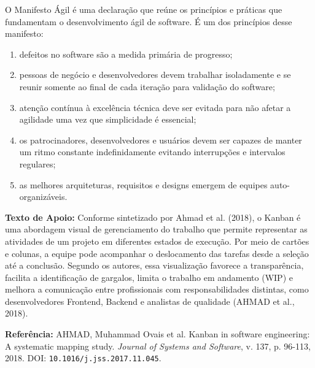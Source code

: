 \documentclass[12pt]{article}
\begin{document}
\vspace{0.15cm}
\noindent O Manifesto Ágil é uma declaração que reúne os princípios e práticas que fundamentam o desenvolvimento ágil de software. É um dos princípios desse manifesto:

\begin{enumerate}[label=\Alph*)]
    \item defeitos no software são a medida primária de progresso;
    \item pessoas de negócio e desenvolvedores devem trabalhar isoladamente e se reunir somente ao final de cada iteração para validação do software;
    \item atenção contínua à excelência técnica deve ser evitada para não afetar a agilidade uma vez que simplicidade é essencial;
    \item os patrocinadores, desenvolvedores e usuários devem ser capazes de manter um ritmo constante indefinidamente evitando interrupções e intervalos regulares;
    \item as melhores arquiteturas, requisitos e designs emergem de equipes auto-organizáveis.
\end{enumerate}

\vspace{0.6cm}

\vspace{0.15cm}

\begin{textoApoio}
\small
\textbf{Texto de Apoio:} Conforme sintetizado por Ahmad et al. (2018), o Kanban é uma abordagem visual de gerenciamento do trabalho que permite representar as atividades de um projeto em diferentes estados de execução. Por meio de cartões e colunas, a equipe pode acompanhar o deslocamento das tarefas desde a seleção até a conclusão. Segundo os autores, essa visualização favorece a transparência, facilita a identificação de gargalos, limita o trabalho em andamento (WIP) e melhora a comunicação entre profissionais com responsabilidades distintas, como desenvolvedores Frontend, Backend e analistas de qualidade (AHMAD et al., 2018).

\vspace{0.15cm}
\noindent\textbf{Referência:} AHMAD, Muhammad Ovais et al. Kanban in software engineering: A systematic mapping study. \textit{Journal of Systems and Software}, v. 137, p. 96-113, 2018. DOI: \texttt{10.1016/j.jss.2017.11.045}.
\end{textoApoio}
\end{document}

